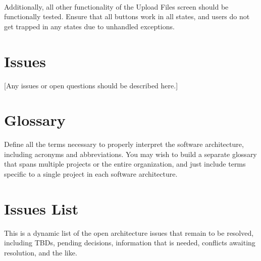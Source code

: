 \documentclass[12pt,oneside,letterpaper]{article}
\begin{document}
\paragraph{} Additionally, all other functionality of the Upload Files screen should be functionally tested. Ensure that all buttons work in all states, and users do not get trapped in any states due to unhandled exceptions.

\section{Issues}
[Any issues or open questions should be described here.]

\appendix
\section{Glossary}
Define all the terms necessary to properly interpret the software architecture, including acronyms and abbreviations. You may wish to build a separate glossary that spans multiple projects or the entire organization, and just include terms specific to a single project in each software architecture.

\section{Issues List}
This is a dynamic list of the open architecture issues that remain to be resolved, including TBDs, pending decisions, information that is needed, conflicts awaiting resolution, and the like.
\end{document}
